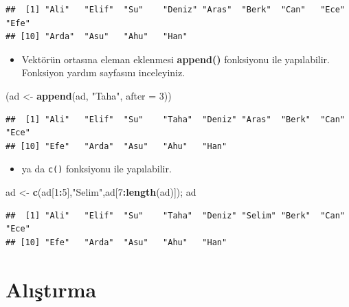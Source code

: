 \documentclass[
  oneside]{book}
\newenvironment{Shaded}{\begin{snugshade}}{\end{snugshade}}
\newcommand{\AttributeTok}[1]{\textcolor[rgb]{0.13,0.29,0.53}{#1}}
\newcommand{\DecValTok}[1]{\textcolor[rgb]{0.00,0.00,0.81}{#1}}
\newcommand{\FunctionTok}[1]{\textcolor[rgb]{0.13,0.29,0.53}{\textbf{#1}}}
\newcommand{\NormalTok}[1]{#1}
\newcommand{\OtherTok}[1]{\textcolor[rgb]{0.56,0.35,0.01}{#1}}
\newcommand{\SpecialCharTok}[1]{\textcolor[rgb]{0.81,0.36,0.00}{\textbf{#1}}}
\newcommand{\StringTok}[1]{\textcolor[rgb]{0.31,0.60,0.02}{#1}}
\providecommand{\tightlist}{%
  \setlength{\itemsep}{0pt}\setlength{\parskip}{0pt}}
\begin{document}
\begin{verbatim}
##  [1] "Ali"   "Elif"  "Su"    "Deniz" "Aras"  "Berk"  "Can"   "Ece"   "Efe"  
## [10] "Arda"  "Asu"   "Ahu"   "Han"
\end{verbatim}

\begin{itemize}
\tightlist
\item
  Vektörün ortasına eleman eklenmesi \textbf{append()} fonksiyonu ile yapılabilir. Fonksiyon yardım sayfasını inceleyiniz.
\end{itemize}

\begin{Shaded}
\begin{Highlighting}[]
\NormalTok{(ad }\OtherTok{\textless{}{-}} \FunctionTok{append}\NormalTok{(ad, }\StringTok{"Taha"}\NormalTok{, }\AttributeTok{after =} \DecValTok{3}\NormalTok{))}
\end{Highlighting}
\end{Shaded}

\begin{verbatim}
##  [1] "Ali"   "Elif"  "Su"    "Taha"  "Deniz" "Aras"  "Berk"  "Can"   "Ece"  
## [10] "Efe"   "Arda"  "Asu"   "Ahu"   "Han"
\end{verbatim}

\begin{itemize}
\tightlist
\item
  ya da \texttt{c()} fonksiyonu ile yapılabilir.
\end{itemize}

\begin{Shaded}
\begin{Highlighting}[]
\NormalTok{ad }\OtherTok{\textless{}{-}} \FunctionTok{c}\NormalTok{(ad[}\DecValTok{1}\SpecialCharTok{:}\DecValTok{5}\NormalTok{],}\StringTok{"Selim"}\NormalTok{,ad[}\DecValTok{7}\SpecialCharTok{:}\FunctionTok{length}\NormalTok{(ad)]); ad}
\end{Highlighting}
\end{Shaded}

\begin{verbatim}
##  [1] "Ali"   "Elif"  "Su"    "Taha"  "Deniz" "Selim" "Berk"  "Can"   "Ece"  
## [10] "Efe"   "Arda"  "Asu"   "Ahu"   "Han"
\end{verbatim}

\hypertarget{alux131ux15ftux131rma-1}{%
\section{Alıştırma}\label{alux131ux15ftux131rma-1}}
\end{document}
